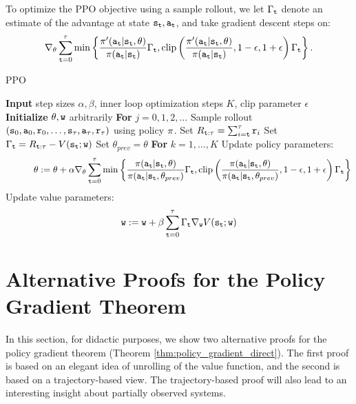 To optimize the PPO objective using a sample rollout, we let $\Gamma_{\tt t}$ denote an estimate of the advantage at state ${\tt s}_{\tt t}, {\tt a}_{\tt t}$, and take gradient descent steps on:
\begin{equation*}
    \nabla_{\theta}\sum_{{\tt t}=0}^\tau \min \left\{\frac{\pi'({\tt a}_{\tt t}|{\tt s}_{\tt t}, \theta)}{\pi({\tt a}_{\tt t}|{\tt s}_{\tt t})}\Gamma_{\tt t},  \textrm{clip}\left(\frac{\pi'({\tt a}_{\tt t}|{\tt s}_{\tt t}, \theta)}{\pi({\tt a}_{\tt t}|{\tt s}_{\tt t})} , 1-\epsilon, 1+\epsilon\right)\Gamma_{\tt t} \right\}.
\end{equation*}

\begin{algorithm}[H]
\caption{PPO}
\begin{algorithmic}[1]
\State \textbf{Input} step sizes $\alpha,\beta$, inner loop optimization steps $K$, clip parameter $\epsilon$
\State \textbf{Initialize} $\theta, {\tt w}$ arbitrarily
\State \textbf{For} $j = 0,1,2,\dots$
\State \quad Sample rollout $({\tt s}_0, {\tt a}_0, {\tt r}_0, \ldots, {\tt s}_\tau, {\tt a}_\tau, {\tt r}_\tau)$ using policy $\pi$.
\State \quad Set $R_{{\tt t}:\tau} = \sum_{i={\tt t}}^\tau {\tt r}_i$
\State \quad Set $\Gamma_{\tt t} = R_{{\tt t}:\tau}-V({\tt s}_{\tt t};{\tt w})$
\State \quad Set $\theta_{prev} = \theta$
\State \quad \textbf{For} $k=1,\dots,K$
\State \quad \quad \quad Update policy parameters:
\[
\quad \quad \quad \theta := \theta + \alpha \nabla_{\theta}\sum_{{\tt t}=0}^\tau \min \left\{\frac{\pi({\tt a}_{\tt t}|{\tt s}_{\tt t}, \theta)}{\pi({\tt a}_{\tt t}|{\tt s}_{\tt t}, \theta_{prev})}\Gamma_{\tt t},  \textrm{clip}\left(\frac{\pi({\tt a}_{\tt t}|{\tt s}_{\tt t}, \theta)}{\pi({\tt a}_{\tt t}|{\tt s}_{\tt t}, \theta_{prev})} , 1-\epsilon, 1+\epsilon\right)\Gamma_{\tt t} \right\}
\]
\State \quad Update value parameters:
\[
{\tt w} := {\tt w} + \beta \sum_{{\tt t}=0}^{\tau} \Gamma_{\tt t} \nabla_{{\tt w}} V({\tt s}_{\tt t};{\tt w})
\]
\end{algorithmic}
\end{algorithm}

\section{Alternative Proofs for the Policy Gradient Theorem}\label{sec:alternative_proof}
In this section, for didactic purposes, we show two alternative proofs for the policy gradient theorem (Theorem \ref{thm:policy_gradient_direct}). The first proof is based on an elegant idea of unrolling of the value function, and the second is based on a trajectory-based view. The trajectory-based proof will also lead to an interesting insight about partially observed systems.


